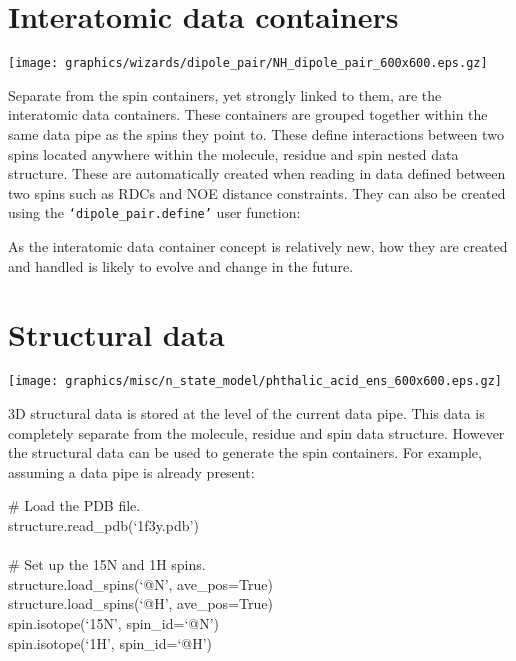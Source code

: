 
\newpage
\section{Interatomic data containers}

\begin{figure*}[h]
\texttt{[image: graphics/wizards/dipole\_pair/NH\_dipole\_pair\_600x600.eps.gz]}
\end{figure*}

Separate from the spin containers, yet strongly linked to them, are the interatomic data containers.  These containers are grouped together within the same data pipe as the spins they point to.  These define interactions between two spins located anywhere within the molecule, residue and spin nested data structure.  These are automatically created when reading in data defined between two spins such as RDCs and NOE distance constraints.  They can also be created using the \texttt{`dipole\_pair.define'} user function:


As the interatomic data container concept is relatively new, how they are created and handled is likely to evolve and change in the future.



\section{Structural data}

\begin{figure*}[h]
\texttt{[image: graphics/misc/n\_state\_model/phthalic\_acid\_ens\_600x600.eps.gz]}
\end{figure*}

3D structural data is stored at the level of the current data pipe.  This data is completely separate from the molecule, residue and spin data structure.  However the structural data can be used to generate the spin containers.  For example, assuming a data pipe is already present:

\begin{exampleenv}
\# Load the PDB file. \\
structure.read\_pdb(`1f3y.pdb') \\
 \\
\# Set up the 15N and 1H spins. \\
structure.load\_spins(`@N', ave\_pos=True) \\
structure.load\_spins(`@H', ave\_pos=True) \\
spin.isotope(`15N', spin\_id=`@N') \\
spin.isotope(`1H', spin\_id=`@H')
\end{exampleenv}


